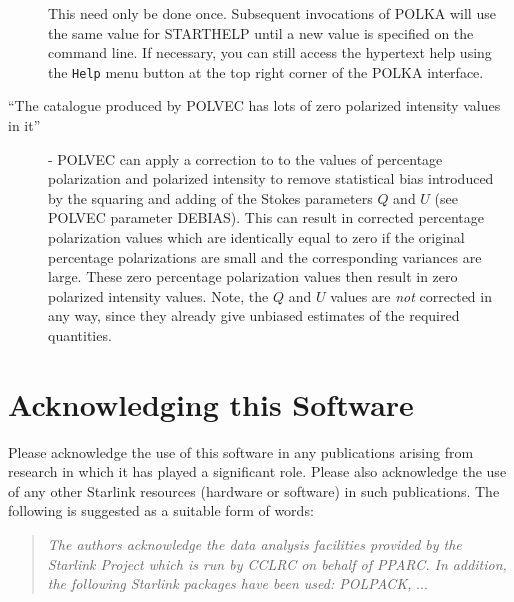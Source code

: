 \documentclass[twoside,11pt]{article}
\newcommand{\htmlref}[2]{#1}
\renewcommand{\_}{\texttt{\symbol{95}}}
\begin{document}
\begin{description}
This need only be done once. Subsequent invocations of POLKA will use the
same value for STARTHELP until a new value is specified on the command
line. If necessary, you can still access the hypertext help using the
\texttt{Help} menu button at the top right corner of the POLKA interface.

\item [``The catalogue produced by POLVEC has lots of zero polarized
intensity values in it''] - POLVEC can apply a correction to to the values
of percentage polarization and polarized intensity to remove statistical
bias introduced by the squaring and adding of the Stokes parameters $Q$ and
$U$ (see \htmlref{POLVEC}{POLVEC} parameter DEBIAS). This can result in 
corrected percentage polarization values which are identically equal to zero
if the original percentage polarizations are small and the corresponding 
variances are large. These zero percentage polarization values then result in
zero polarized intensity values. Note, the $Q$ and $U$ values are
\emph{not} corrected in any way, since they already give unbiased
estimates of the required quantities.

\end{description}

\section{Acknowledging this Software}
Please acknowledge the use of this software in any publications arising
from research in which it has played a significant role. Please also
acknowledge the use of any other Starlink resources (hardware or
software) in such publications. The following is suggested as a suitable
form of words:

\begin{center}
\begin{quote}
\emph{The authors acknowledge the data analysis facilities provided by
the Starlink Project which is run by CCLRC on behalf of PPARC. In
addition, the following Starlink packages have been used: POLPACK,} ...
\end{quote}
\end{center}


\newpage
\appendix
\end{document}
